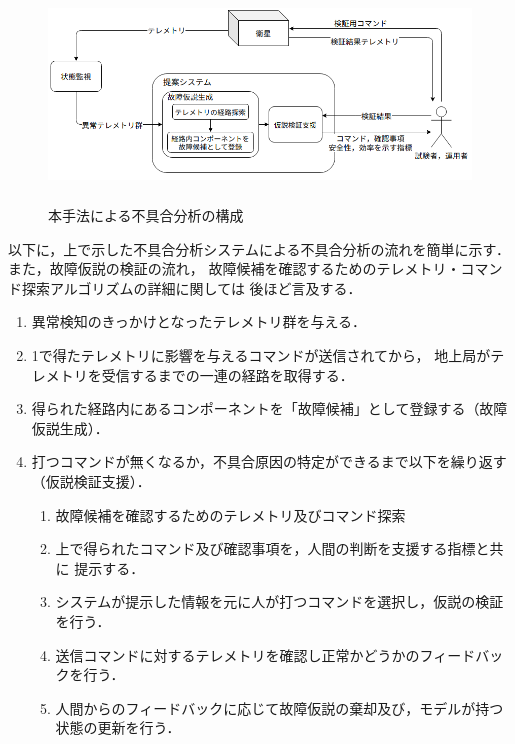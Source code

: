 \documentclass[11pt]{jsreport}
\begin{document}
\begin{figure}[H]
   \centering
     \includegraphics[height=5.7cm]{figure/whole_flow.png}
     \caption{本手法による不具合分析の構成}
     \label{fig:whole_flow}
 \end{figure}

以下に，上で示した不具合分析システムによる不具合分析の流れを簡単に示す．
また，故障仮説の検証の流れ，
故障候補を確認するためのテレメトリ・コマンド探索アルゴリズムの詳細に関しては
後ほど言及する．

\begin{enumerate}[1]
   \item 異常検知のきっかけとなったテレメトリ群を与える．
   \item 1で得たテレメトリに影響を与えるコマンドが送信されてから，
   地上局がテレメトリを受信するまでの一連の経路を取得する．
   \item 得られた経路内にあるコンポーネントを「故障候補」として登録する（故障仮説生成）．
   \item 打つコマンドが無くなるか，不具合原因の特定ができるまで以下を繰り返す（仮説検証支援）．
   \begin{enumerate}[a]
      \item 故障候補を確認するためのテレメトリ及びコマンド探索
      \item 上で得られたコマンド及び確認事項を，人間の判断を支援する指標と共に
      提示する．
      \item システムが提示した情報を元に人が打つコマンドを選択し，仮説の検証を行う．
      \item 送信コマンドに対するテレメトリを確認し正常かどうかのフィードバックを行う．
      \item 人間からのフィードバックに応じて故障仮説の棄却及び，モデルが持つ状態の更新を行う．
   \end{enumerate}
\end{enumerate}
\end{document}

